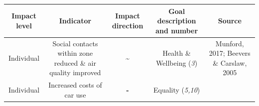 \documentclass[
]{book}
\begin{document}
\begin{longtable}[]{@{}ccccc@{}}
\toprule
\begin{minipage}[b]{0.17\columnwidth}\centering
Impact level\strut
\end{minipage} & \begin{minipage}[b]{0.16\columnwidth}\centering
Indicator\strut
\end{minipage} & \begin{minipage}[b]{0.17\columnwidth}\centering
Impact direction\strut
\end{minipage} & \begin{minipage}[b]{0.17\columnwidth}\centering
Goal description and number\strut
\end{minipage} & \begin{minipage}[b]{0.17\columnwidth}\centering
Source\strut
\end{minipage}\tabularnewline
\midrule
\endhead
\begin{minipage}[t]{0.17\columnwidth}\centering
Individual\strut
\end{minipage} & \begin{minipage}[t]{0.16\columnwidth}\centering
Social contacts within zone reduced \& air quality improved\strut
\end{minipage} & \begin{minipage}[t]{0.17\columnwidth}\centering
\textbf{\textasciitilde{}}\strut
\end{minipage} & \begin{minipage}[t]{0.17\columnwidth}\centering
Health \& Wellbeing (\emph{3})\strut
\end{minipage} & \begin{minipage}[t]{0.17\columnwidth}\centering
Munford, 2017; Beevers \& Carslaw, 2005\strut
\end{minipage}\tabularnewline
\begin{minipage}[t]{0.17\columnwidth}\centering
Individual\strut
\end{minipage} & \begin{minipage}[t]{0.16\columnwidth}\centering
Increased costs of car use\strut
\end{minipage} & \begin{minipage}[t]{0.17\columnwidth}\centering
\textbf{-}\strut
\end{minipage} & \begin{minipage}[t]{0.17\columnwidth}\centering
Equality (\emph{5,10})\strut
\end{minipage} & \begin{minipage}[t]{0.17\columnwidth}\centering

\end{minipage}
\end{longtable}
\end{document}
